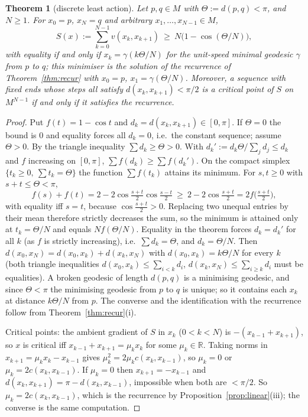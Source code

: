 \documentclass[11pt,reqno]{amsart}
\newtheorem{theorem}{Theorem}[section]
\theoremstyle{definition}
\theoremstyle{remark}
\numberwithin{equation}{section}
\newcommand{\R}{\mathbb{R}}
\begin{document}
\begin{theorem}[discrete least action]\label{thm:action}
Let $p,q\in M$ with $\Theta:=d(p,q)<\pi$, and $N\ge1$.  For $x_0=p$, $x_N=q$ and arbitrary
$x_1,\dots,x_{N-1}\in M$,
\[
S(x):=\sum_{k=0}^{N-1}v(x_k,x_{k+1})\ \ge\ N\bigl(1-\cos(\Theta/N)\bigr),
\]
with equality if and only if $x_k=\gamma(k\Theta/N)$ for the unit-speed minimal geodesic $\gamma$ from $p$ to
$q$; this minimiser is the solution of the recurrence of Theorem~\ref{thm:recur} with $x_0=p$,
$x_1=\gamma(\Theta/N)$.  Moreover, a sequence with fixed ends whose steps all satisfy $d(x_k,x_{k+1})<\pi/2$ is
a critical point of $S$ on $M^{N-1}$ if and only if it satisfies the recurrence.
\end{theorem}
\begin{proof}
Put $f(t)=1-\cos t$ and $d_k=d(x_k,x_{k+1})\in[0,\pi]$.  If $\Theta=0$ the bound is $0$ and equality forces all
$d_k=0$, i.e.\ the constant sequence; assume $\Theta>0$.  By the triangle inequality $\sum d_k\ge\Theta>0$.
With $d_k':=d_k\Theta/\sum_jd_j\le d_k$ and $f$ increasing on $[0,\pi]$, $\sum f(d_k)\ge\sum f(d_k')$.  On the
compact simplex $\{t_k\ge0,\ \sum t_k=\Theta\}$ the function $\sum f(t_k)$ attains its minimum.  For
$s,t\ge0$ with $s+t\le\Theta<\pi$,
\[
f(s)+f(t)=2-2\cos\tfrac{s+t}2\cos\tfrac{s-t}2\ \ge\ 2-2\cos\tfrac{s+t}2=2f\bigl(\tfrac{s+t}2\bigr),
\]
with equality iff $s=t$, because $\cos\frac{s+t}2>0$.  Replacing two unequal entries by their mean therefore
strictly decreases the sum, so the minimum is attained only at $t_k=\Theta/N$ and equals $Nf(\Theta/N)$.
Equality in the theorem forces $d_k=d_k'$ for all $k$ (as $f$ is strictly increasing), i.e.\
$\sum d_k=\Theta$, and $d_k=\Theta/N$.  Then
$d(x_0,x_N)=d(x_0,x_k)+d(x_k,x_N)$ with $d(x_0,x_k)=k\Theta/N$ for every $k$ (both triangle inequalities
$d(x_0,x_k)\le\sum_{i<k}d_i$, $d(x_k,x_N)\le\sum_{i\ge k}d_i$ must be equalities).  A broken geodesic of length $d(p,q)$ is a
minimising geodesic, and since $\Theta<\pi$ the minimising geodesic from $p$ to $q$ is unique; so it contains each $x_k$
at distance $k\Theta/N$ from $p$.  The
converse and the identification with the recurrence follow from Theorem~\ref{thm:recur}(i).

Critical points: the ambient gradient of $S$ in $x_k$ ($0<k<N$) is $-(x_{k-1}+x_{k+1})$, so $x$ is critical iff
$x_{k-1}+x_{k+1}=\mu_kx_k$ for some $\mu_k\in\R$.  Taking norms in $x_{k+1}=\mu_kx_k-x_{k-1}$ gives
$\mu_k^2=2\mu_kc(x_k,x_{k-1})$, so $\mu_k=0$ or $\mu_k=2c(x_k,x_{k-1})$.  If $\mu_k=0$ then $x_{k+1}=-x_{k-1}$
and $d(x_k,x_{k+1})=\pi-d(x_k,x_{k-1})$, impossible when both are $<\pi/2$.  So $\mu_k=2c(x_k,x_{k-1})$, which is
the recurrence by Proposition~\ref{prop:linear}(iii); the converse is the same computation.
\end{proof}
\end{document}
